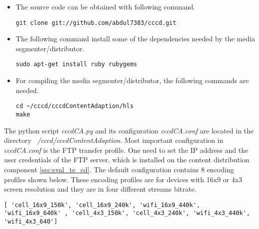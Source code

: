 \begin{itemize}

\item The source code can be obtained with following command.

\begin{code}
\begin{verbatim}
git clone git://github.com/abdul7383/cccd.git
\end{verbatim}
\end{code}

\item The following command install some of the dependencies needed by the media segmenter/distributor.

\begin{code}
\begin{verbatim}
sudo apt-get install ruby rubygems
\end{verbatim}
\end{code}

\item For compiling the media segmenter/distributor, the following commands are needed.

\begin{code}
\begin{verbatim}
cd ~/cccd/cccdContentAdaption/hls
make
\end{verbatim}
\end{code}

\end{itemize} 

The python script \textit{cccdCA.py} and its configuration \textit{cccdCA.conf} are located in the directory \textit{~/cccd/cccdContentAdaption}. Most important configuration in \textit{ cccdCA.conf}  is the FTP transfer profile. One need to set the IP address and the user credentials of the FTP server, which is installed on the content distribution component \ref{sec:eval_te_cd}. The default configuration contains 8 encoding profiles shown below. These encoding profiles are for devices with 16x9 or 4x3 screen resolution and they are in four different streams bitrate.

\begin{code}
\begin{verbatim}
[ 'cell_16x9_150k', 'cell_16x9_240k', 'wifi_16x9_440k', 'wifi_16x9_640k' , 'cell_4x3_150k', 'cell_4x3_240k', 'wifi_4x3_440k', 'wifi_4x3_640']
\end{verbatim}
\end{code}

